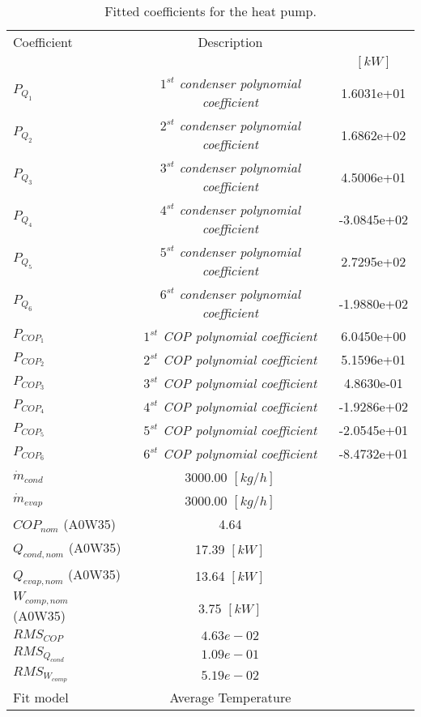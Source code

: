 \documentclass[english]{SPFShortReport}
\author{Dani Carbonell}
\begin{document}
\begin{table}[!ht]
\begin{small}
\caption{Fitted coefficients for the heat pump.}
\begin{center}
\resizebox{12cm}{!} 
{
\begin{tabular}{l | c c } 
\hline
\hline
Coefficient &Description & \\ 
 & &$[kW]$\\ 
\hline
$P_{Q_{1}}$ & \emph{$1^{st}$ condenser polynomial coefficient}  & 1.6031e+01    \\ 
$P_{Q_{2}}$ & \emph{$2^{st}$ condenser polynomial coefficient}  & 1.6862e+02    \\ 
$P_{Q_{3}}$ & \emph{$3^{st}$ condenser polynomial coefficient}  & 4.5006e+01    \\ 
$P_{Q_{4}}$ & \emph{$4^{st}$ condenser polynomial coefficient}  & -3.0845e+02    \\ 
$P_{Q_{5}}$ & \emph{$5^{st}$ condenser polynomial coefficient}  & 2.7295e+02    \\ 
$P_{Q_{6}}$ & \emph{$6^{st}$ condenser polynomial coefficient}  & -1.9880e+02    \\ 
\hline
$P_{COP_{1}}$ & \emph{$1^{st}$ COP polynomial coefficient}  & 6.0450e+00    \\ 
$P_{COP_{2}}$ & \emph{$2^{st}$ COP polynomial coefficient}  & 5.1596e+01    \\ 
$P_{COP_{3}}$ & \emph{$3^{st}$ COP polynomial coefficient}  & 4.8630e-01    \\ 
$P_{COP_{4}}$ & \emph{$4^{st}$ COP polynomial coefficient}  & -1.9286e+02    \\ 
$P_{COP_{5}}$ & \emph{$5^{st}$ COP polynomial coefficient}  & -2.0545e+01    \\ 
$P_{COP_{6}}$ & \emph{$6^{st}$ COP polynomial coefficient}  & -8.4732e+01    \\ 
\hline
$\dot m_{cond}$ & 3000.00 $[kg/h]$ \\ 
$\dot m_{evap}$ & 3000.00 $[kg/h]$ \\ 
\hline
$COP_{nom}$ (A0W35)& 4.64 \\ 
$Q_{cond,nom}$ (A0W35)& 17.39 $[kW]$\\ 
$Q_{evap,nom}$ (A0W35)& 13.64 $[kW]$\\ 
$W_{comp,nom}$ (A0W35)& 3.75 $[kW]$\\ 
\hline
 $RMS_{COP}$ & $4.63e-02$ \\ 
 $RMS_{Q_{cond}}$ & $1.09e-01$ \\ 
 $RMS_{W_{comp}}$ & $5.19e-02$ \\ 
\hline
Fit model & Average Temperature\\ 
\hline
\hline
\end{tabular}
}
\label{CoefTable}
\end{center}
\end{small}
\end{table}
\end{document}
